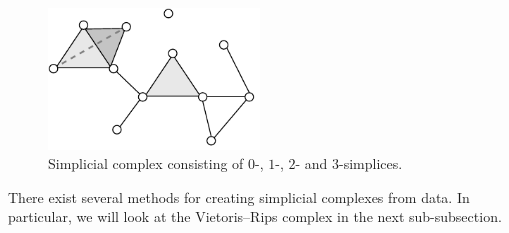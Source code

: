 \begin{figure}[H]
    \centering
    \includegraphics[width=0.5\textwidth]{thesis/figures/simplicial-complex_cropped.pdf}
    \caption{Simplicial complex consisting of $0$-, $1$-, $2$- and $3$-simplices.}
    \label{fig:simplicial-complex}
\end{figure}
There exist several methods for creating simplicial complexes from data. In particular, we will look at the Vietoris–Rips complex in the next sub-subsection.

